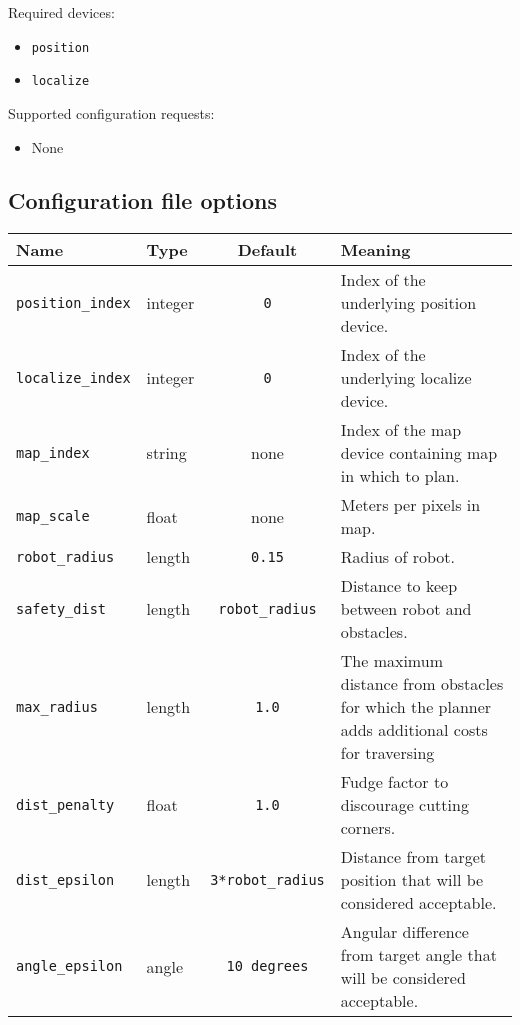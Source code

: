 \noindent Required devices:
\begin{itemize}
\item {\tt position}
\item {\tt localize}
\end{itemize}

\noindent Supported configuration requests:
\begin{itemize}
\item None
\end{itemize}

\subsection*{Configuration file options}

\begin{center}
{\small \begin{tabularx}{\columnwidth}{|l|l|c|X|}
\hline
Name & Type & Default & Meaning\\
\hline
{\tt position\_index} & integer & {\tt 0} & Index of the underlying position device.\\
{\tt localize\_index} & integer & {\tt 0} & Index of the underlying
localize device.\\
{\tt map\_index} & string & none & Index of the map device containing map in which
to plan.\\
{\tt map\_scale} & float & none & Meters per pixels in map.\\
{\tt robot\_radius} & length & {\tt 0.15} & Radius of robot.\\
{\tt safety\_dist} & length & {\tt robot\_radius} & Distance to keep
between robot and obstacles.\\
{\tt max\_radius} & length & {\tt 1.0} & The maximum distance from obstacles for which the planner adds additional costs for traversing\\
{\tt dist\_penalty} & float & {\tt 1.0} & Fudge factor to discourage
cutting corners.\\
{\tt dist\_epsilon} & length & {\tt 3*robot\_radius} & Distance from target
position that will be considered acceptable.\\
{\tt angle\_epsilon} & angle & {\tt 10 degrees} & Angular difference from target
angle that will be considered acceptable.\\
\hline
\end{tabularx}}
\end{center}

